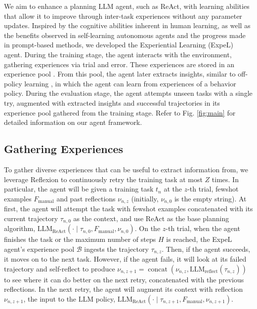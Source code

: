 \documentclass[letterpaper]{article} %
\begin{document}
We aim to enhance a planning LLM agent, such as ReAct, with learning abilities that allow it to improve through inter-task experiences without any parameter updates. Inspired by the cognitive abilities inherent in human learning, as well as the benefits observed in self-learning autonomous agents and the progress made in prompt-based methods, we developed the Experiential Learning (ExpeL) agent. During the training stage, the agent interacts with the environment, gathering experiences via trial and error. These experiences are stored in an experience pool \cite{lin1992self}. From this pool, the agent later extracts insights, similar to off-policy learning \cite{watkins1992q}, in which the agent can learn from experiences of a behavior policy. During the evaluation stage, the agent attempts unseen tasks with a single try, augmented with extracted insights and successful trajectories in its experience pool gathered from the training stage. Refer to Fig. \ref{fig:main} for detailed information on our agent framework.

\subsection{Gathering Experiences}
To gather diverse experiences that can be useful to extract information from, we leverage Reflexion \cite{shinn2023reflexion} to continuously retry the training task at most $Z$ times. In particular, the agent will be given a training task $t_n$ at the $z$-th trial, fewshot examples $F_\text{manual}$ and past reflections $\nu_{n,z}$ (initially, $\nu_{n,0}$ is the empty string). At first, the agent will attempt the task with fewshot examples concatenated with its current trajectory $\tau_{n,0}$ as the context, and use ReAct \cite{yao2022react} as the base planning algorithm, $\text{LLM}_\text{ReAct}(\cdot\mid\tau_{n,0},F_\text{manual},\nu_{n,0})$. On the $z$-th trial, when the agent finishes the task or the maximum number of steps $H$ is reached, the ExpeL agent's experience pool $\mathcal{B}$ ingests the trajectory $\tau_{n,z}$. Then, if the agent succeeds, it moves on to the next task. However, if the agent fails, it will look at its failed trajectory and self-reflect to produce $\nu_{n,z+1}=\operatorname{concat}(\nu_{n,z},\text{LLM}_\text{reflect}(\tau_{n,z}))$ to see where it can do better on the next retry, concatenated with the previous reflections. In the next retry, the agent will augment its context with reflection $\nu_{n,z+1}$, the input to the LLM policy, $\text{LLM}_\text{ReAct}(\cdot\mid \tau_{n,z+1},F_\text{manual},\nu_{n,z+1})$.
\end{document}
